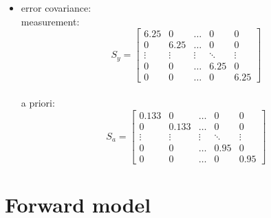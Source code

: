 \begin{itemize}
	\item error covariance: \\
	measurement: $$
	S_y = \begin{bmatrix}
	6.25 	& 0 	& \dots & 0 		& 0         \\%
	0		& 6.25 & \dots	& 0 		& 0		 \\
	\vdots 	& \vdots& \vdots& \ddots 	& \vdots \\
	0		& 0		& \dots	& 6.25		& 0 \\
	0 		& 0		& \dots & 0 		& 6.25
	\end{bmatrix} $$
	\\
	a priori: $$
	S_a = \begin{bmatrix}
	0.133 	& 0 	& \dots & 0 		& 0         \\%
	0		& 0.133 & \dots	& 0 		& 0		 \\
	\vdots 	& \vdots& \vdots& \ddots 	& \vdots \\
	0		& 0		& \dots	& 0.95 		& 0 \\
	0 		& 0		& \dots & 0 		& 0.95
	\end{bmatrix} $$
\end{itemize}


\section{Forward model}




